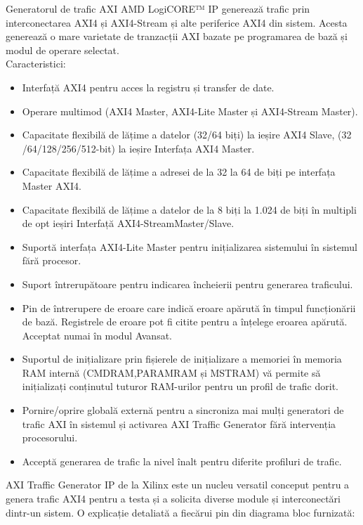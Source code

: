 \documentclass[12pt]{article}
\begin{document}
\hspace*{1cm}Generatorul de trafic AXI AMD LogiCORE™ IP generează trafic prin interconectarea AXI4 și AXI4-Stream și alte periferice AXI4 din sistem. Acesta generează o mare varietate de tranzacții AXI bazate pe programarea de bază și modul de operare selectat.\\
Caracteristici:
\begin{itemize}
    \item Interfață AXI4 pentru acces la registru și transfer de date.
    \item Operare multimod (AXI4 Master, AXI4-Lite Master și AXI4-Stream Master).
    \item Capacitate flexibilă de lățime a datelor (32/64 biți) la ieșire AXI4 Slave, (32 /64/128/256/512-bit) la ieșire Interfața AXI4 Master.
    \item Capacitate flexibilă de lățime a adresei de la 32 la 64 de biți pe interfața Master AXI4.
    \item Capacitate flexibilă de lățime a datelor de la 8 biți la 1.024 de biți în multipli de opt ieșiri Interfață AXI4-StreamMaster/Slave.
    \item Suportă interfața AXI4-Lite Master pentru inițializarea sistemului în sistemul fără procesor.
    \item Suport întrerupătoare pentru indicarea încheierii pentru generarea traficului.
    \item Pin de întrerupere de eroare care indică eroare apărută în timpul funcționării de bază. Registrele de eroare pot fi citite pentru a înțelege eroarea apărută. Acceptat numai în modul Avansat.
    \item Suportul de inițializare prin fișierele de inițializare a memoriei în memoria RAM internă (CMDRAM,PARAMRAM și MSTRAM) vă permite să inițializați conținutul tuturor RAM-urilor pentru un profil de trafic dorit.
    \item Pornire/oprire globală externă pentru a sincroniza mai mulți generatori de trafic AXI în sistemul și activarea AXI Traffic Generator fără intervenția procesorului.
    \item Acceptă generarea de trafic la nivel înalt pentru diferite profiluri de trafic.\\
\end{itemize}
\hspace*{1cm}AXI Traffic Generator IP de la Xilinx este un nucleu versatil conceput pentru a genera trafic AXI4 pentru a testa și a solicita diverse module și interconectări dintr-un sistem. O explicație detaliată a fiecărui pin din diagrama bloc furnizată:
\end{document}
